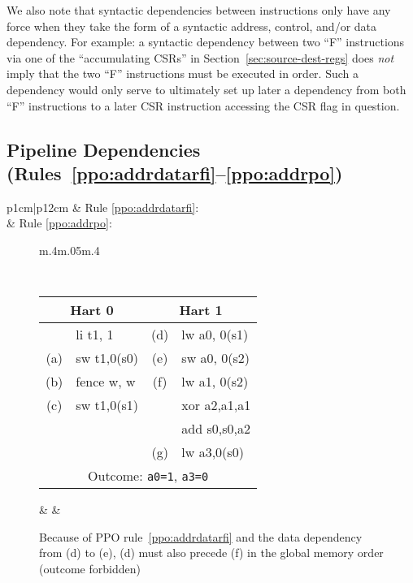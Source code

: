 We also note that syntactic dependencies between instructions only have any force when they take the form of a syntactic address, control, and/or data dependency.
For example: a syntactic dependency between two ``F'' instructions via one of the ``accumulating CSRs'' in Section~\ref{sec:source-dest-regs} does {\em not} imply that the two ``F'' instructions must be executed in order.
Such a dependency would only serve to ultimately set up later a dependency from both ``F'' instructions to a later CSR instruction accessing the CSR flag in question.

\subsection{Pipeline Dependencies (Rules~\ref{ppo:addrdatarfi}--\ref{ppo:addrpo})}
\label{sec:memory:ppopipeline}
\begin{tabular}{p{1cm}|p{12cm}}
  & Rule \ref{ppo:addrdatarfi}: \ppoaddrdatarfi \\
  & Rule \ref{ppo:addrpo}: \ppoaddrpo \\
\end{tabular}

\begin{figure}[h!]
  \centering
  \begin{tabular}{m{.4\linewidth}m{.05\linewidth}m{.4\linewidth}}
  {
    \tt\small
    \begin{tabular}{cl||cl}
    \multicolumn{2}{c}{Hart 0} & \multicolumn{2}{c}{Hart 1} \\
    \hline
          & li t1, 1    & (d) & lw a0, 0(s1)   \\
      (a) & sw t1,0(s0) & (e) & sw a0, 0(s2)   \\
      (b) & fence w, w  & (f) & lw a1, 0(s2)   \\
      (c) & sw t1,0(s1) &     & xor a2,a1,a1   \\
          &             &     & add s0,s0,a2   \\
          &             & (g) & lw a3,0(s0)    \\   
      \hline
      \multicolumn{4}{c}{Outcome: {\tt a0=1}, {\tt a3=0}}
    \end{tabular}
  } & &
  
  \end{tabular}

  \caption{Because of PPO rule~\ref{ppo:addrdatarfi} and the data dependency from (d) to (e), (d) must also precede (f) in the global memory order (outcome forbidden)}
  \label{fig:litmus:addrdatarfi}
\end{figure}


